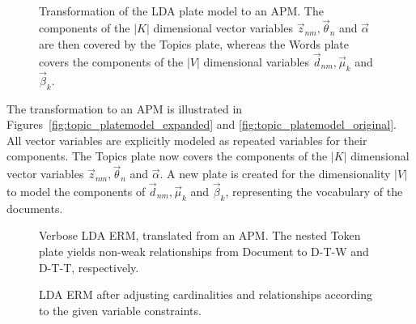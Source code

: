 \begin{figure}[t]
\begin{minipage}[t]{0.49\linewidth}
	\begin{center}
	\end{center}
\end{minipage}
\hspace{0.0cm}
\begin{minipage}[t]{0.49\linewidth}
	\begin{center}
	\end{center}
\end{minipage}\\
\caption[Transformation of LDA plate model to an APM]{Transformation of the LDA plate model to an APM. The components of the $|K|$ dimensional vector variables $\vec z_{nm}, \vec \theta_n$ and $\vec \alpha$ are then covered by the Topics plate, whereas the Words plate covers the components of the $|V|$ dimensional variables $\vec d_{nm}, \vec \mu_k$ and $\vec \beta_k$.}
\label{img:topic_platemodels}
\end{figure}

The transformation to an APM is illustrated in Figures~\ref{fig:topic_platemodel_expanded} and \ref{fig:topic_platemodel_original}. All vector variables are explicitly modeled as repeated variables for their components. The Topics plate now covers the components of the $|K|$ dimensional vector variables $\vec z_{nm}, \vec \theta_n$ and $\vec \alpha$. A new plate is created for the dimensionality $|V|$ to model the components of $\vec d_{nm}, \vec \mu_k$ and $\vec \beta_k$, representing the vocabulary of the documents.

\begin{figure}[p]
\centering
\scalebox{0.5}{\adjustTikzSize }
\caption[Verbose LDA ERM, translated from an APM]{Verbose LDA ERM, translated from an APM. The nested Token plate yields non-weak relationships from Document to D-T-W and D-T-T, respectively.}\label{fig:topic_erm_good_verbose}
\end{figure}

\begin{figure}[p]
\centering
\scalebox{0.5}{\adjustTikzSize }
\caption[LDA ERM after taking constraints into account]{LDA ERM after adjusting cardinalities and relationships according to the given variable constraints.}\label{fig:topic_erm_good_constraints}
\end{figure}

